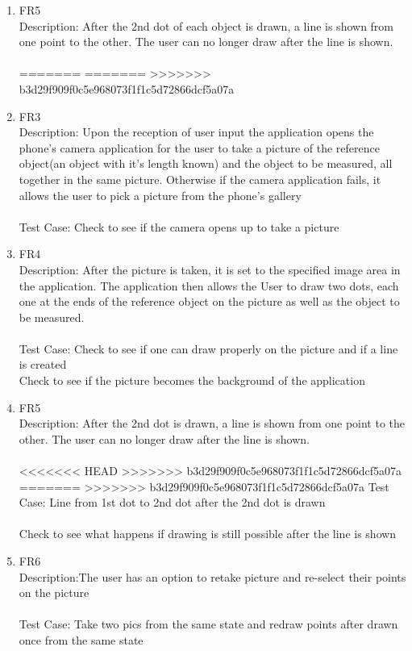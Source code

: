 \documentclass[12pt, titlepage]{article}
\begin{document}
\begin{enumerate}{}{}
\item FR5\\Description: After the 2nd dot of each object is drawn, a line is shown from one point to the other. The user can no longer draw after the line is shown. \\ \\
=======
=======
>>>>>>> b3d29f909f0c5e968073f1f1c5d72866dcf5a07a
\item FR3 \\Description: Upon the reception of user input the application opens the phone’s camera application for the user to take a picture of the reference object(an object with it’s length known) and the object to be measured, all together in the same picture. Otherwise if the camera application fails, it allows the user to pick a picture from the phone's gallery \\ \\
 Test Case: Check to see if the camera opens up to take a picture

\item FR4 \\Description: After the picture is taken, it is set to the specified image area in the application.  The application then allows the User to draw  two dots, each one at the ends of the reference object on the picture as well as the object to be measured. \\\\
 Test Case: Check to see if one can draw properly on the picture and if a line is created\\ 
  Check to see if the picture becomes the background of the application

\item FR5\\Description: After the 2nd dot is drawn, a line is shown from one point to the other. The user can no longer draw after the line is shown. \\ \\
<<<<<<< HEAD
>>>>>>> b3d29f909f0c5e968073f1f1c5d72866dcf5a07a
=======
>>>>>>> b3d29f909f0c5e968073f1f1c5d72866dcf5a07a
 Test Case: Line from 1st dot to 2nd dot after the 2nd dot is drawn \\ \\
  Check to see what happens if drawing is still possible after the line is shown

\item FR6 \\Description:The user has an option to retake picture and re-select their points on the picture \\   \\          
 Test Case: Take two pics from the same state and redraw points after drawn once  from the same state


\end{enumerate}
\end{document}
